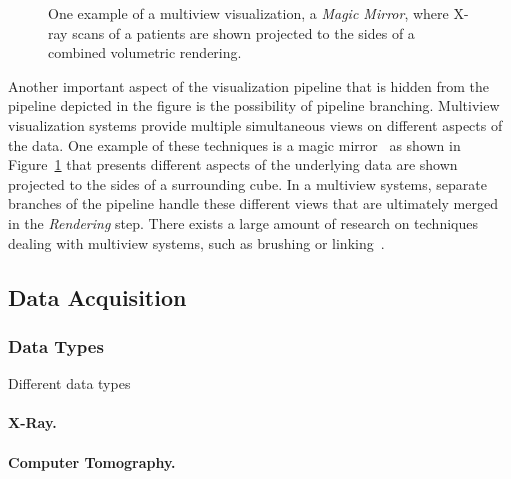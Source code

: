 \begin{figure}
  \centering
  \caption{One example of a multiview visualization, a \emph{Magic Mirror}, where X-ray scans of a patients are shown projected to the sides of a combined volumetric rendering.}
  \label{fig:intro:mm}
\end{figure}

Another important aspect of the visualization pipeline that is hidden from the pipeline depicted in the figure is the possibility of pipeline branching.  Multiview visualization systems provide multiple simultaneous views on different aspects of the data.  One example of these techniques is a magic mirror~\cite{konig1999multiple} as shown in Figure~\ref{fig:intro:mm} that presents different aspects of the underlying data are shown projected to the sides of a surrounding cube.  In a multiview systems, separate branches of the pipeline handle these different views that are ultimately merged in the \emph{Rendering} step.  There exists a large amount of research on techniques dealing with multiview systems, such as brushing or linking~\cite{tory2003mental}.

\subsection{Data Acquisition} \label{cha:intro:vp:da}

\subsubsection{Data Types} \label{cha:intro:vp:da:types}
Different data types

\paragraph{X-Ray. }
\paragraph{Computer Tomography. }
